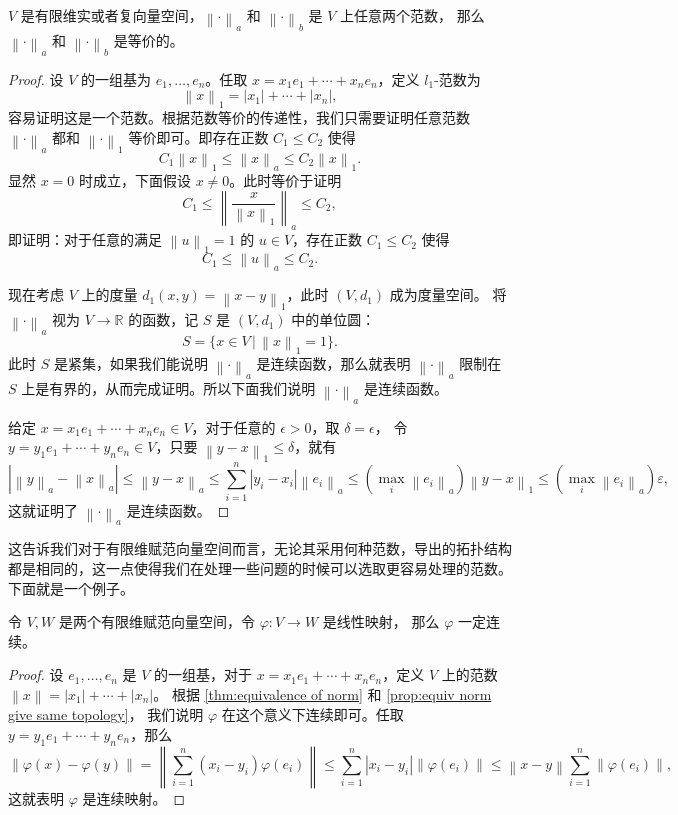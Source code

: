 \documentclass[fontset=none,zihao=-4]{Notes}
\newcommand{\norm}[1]{\left\lVert#1\right\rVert}
\begin{document}
\begin{theorem}\label{thm:equivalence of norm}
  $V$ 是有限维实或者复向量空间，$\norm{\cdot}_a$ 和 $\norm{\cdot}_b$ 是 $V$ 上任意两个范数，
  那么 $\norm{\cdot}_a$ 和 $\norm{\cdot}_b$ 是等价的。 
\end{theorem}
\begin{proof}
  设 $V$ 的一组基为 $e_1,\dots,e_n$。任取 $x=x_1e_1+\cdots+x_ne_n$，定义 $l_1$-范数为
  \[
    \norm{x}_1=|x_1|+\cdots+|x_n|,  
  \]
  容易证明这是一个范数。根据范数等价的传递性，我们只需要证明任意范数 $\norm{\cdot}_a$
  都和 $\norm{\cdot}_1$ 等价即可。即存在正数 $C_1\leq C_2$ 使得
  \[
    C_1\norm{x}_1\leq \norm{x}_a\leq C_2\norm{x}_1.  
  \]
  显然 $x=0$ 时成立，下面假设 $x\neq 0$。此时等价于证明
  \[
    C_1\leq \norm{\frac{x}{\norm{x}_1}}_a  \leq C_2,
  \]
  即证明：对于任意的满足 $\norm{u}_1=1$ 的 $u\in V$，存在正数 $C_1\leq C_2$ 使得
  \[
    C_1\leq \norm{u}_a\leq C_2.  
  \]

  现在考虑 $V$ 上的度量 $d_1(x,y)=\norm{x-y}_1$，此时 $(V,d_1)$ 成为度量空间。
  将 $\norm{\cdot}_a$ 视为 $V\to\mathbb{R}$ 的函数，记 $S$ 是 $(V,d_1)$ 中的单位圆：
  \[
    S=  \{x\in V\,|\, \norm{x}_1=1\}.
  \]
  此时 $S$ 是紧集，如果我们能说明 $\norm{\cdot}_a$ 是连续函数，那么就表明
  $\norm{\cdot}_a$ 限制在 $S$ 上是有界的，从而完成证明。所以下面我们说明 $\norm{\cdot}_a$
  是连续函数。

  给定 $x=x_1e_1+\cdots+x_ne_n\in V$，对于任意的 $\epsilon>0$，取 $\delta=\epsilon$，
  令 $y=y_1e_1+\cdots+y_ne_n\in V$，只要 $\norm{y-x}_1\leq\delta$，就有
  \[
    \left|\norm{y}_a-\norm{x}_a\right|  \leq\norm{y-x}_a
    \leq \sum_{i=1}^n |y_i-x_i|\norm{e_i}_a\leq 
    \left(\max_i\norm{e_i}_a\right)\norm{y-x}_1\leq \left(\max_i\norm{e_i}_a\right)\varepsilon,
  \]
  这就证明了 $\norm{\cdot}_a$ 是连续函数。
\end{proof}

这告诉我们对于有限维赋范向量空间而言，无论其采用何种范数，导出的拓扑结构
都是相同的，这一点使得我们在处理一些问题的时候可以选取更容易处理的范数。下面就是一个例子。

\begin{proposition}
  令 $V,W$ 是两个有限维赋范向量空间，令 $\varphi:V\to W$ 是线性映射，
  那么 $\varphi$ 一定连续。
\end{proposition}
\begin{proof}
  设 $e_1,\dots,e_n$ 是 $V$ 的一组基，对于 $x=x_1e_1+\cdots+x_ne_n$，定义 $V$
  上的范数 $\norm{x}=|x_1|+\cdots+|x_n|$。
  根据 \autoref{thm:equivalence of norm} 和 \autoref{prop:equiv norm give same topology}，
  我们说明 $\varphi$ 在这个意义下连续即可。任取 $y=y_1e_1+\cdots+y_ne_n$，那么
  \[
    \norm{\varphi(x)-\varphi(y)}=\norm{\sum_{i=1}^n(x_i-y_i)\varphi(e_i)}
    \leq \sum_{i=1}^n|x_i-y_i|\norm{\varphi(e_i)}\leq \norm{x-y}\sum_{i=1}^n\norm{\varphi(e_i)},  
  \]
  这就表明 $\varphi$ 是连续映射。
\end{proof}
\end{document}
